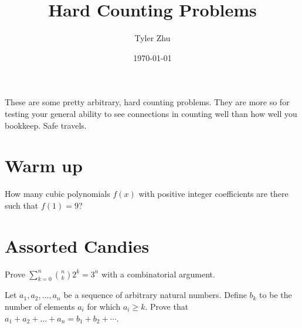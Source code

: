\documentclass[11 pt]{scrartcl}
\newcommand{\hwtitle}{Hard Counting Problems}
\newif\ifproblemsol
\begin{document}
 
\title{\Large \hwtitle{}}
\author{\large Tyler Zhu}
\date{\large\today}

\maketitle 

These are some pretty arbitrary, hard counting problems. They are more so for testing your general ability to see connections in counting well than how well you bookkeep. Safe travels.  

\section{Warm up}
\begin{problem}
    How many cubic polynomials $f(x)$ with positive integer coefficients are there such that $f(1) = 9$?
\end{problem}
\ifproblemsol
\begin{proof}[Solution]
    Let $f(x) = ax^3+bx^2+cx+d$. The only condition on $f(x)$ is that $f(1) = 9$, which means $a + b + c + d = 9$. Since $a,b,c,d$ are positive integers, there are $\binom{8}{3} = 56$ such polynomials. 
\end{proof}
\fi

\section{Assorted Candies}
\begin{problem}
    Prove $\sum_{k=0}^n \binom{n}{k} 2^k = 3^n$ with a combinatorial argument. 
\end{problem}
\ifproblemsol
\begin{proof}[Solution]
    Suppose we're trying to create a $n$-bead string with 3 colors; red, blue and green. We can either have 3 chocies for each spot for a total of $3^n$, or pick the $n-k$ spots which will be red, and then fill in the remaining $k$ spots with either blue or green for a total of $\binom{n}{k}2^k$ for each choice of $k$. 
\end{proof}
\fi

\begin{problem}
    Let $a_1, a_2, \dots, a_n$ be a sequence of arbitrary natural numbers. Define $b_k$ to be the number of elements $a_i$ for which $a_i \geq k$. Prove that $a_1 + a_2 + \dots + a_n = b_1 + b_2 + \cdots$. 
\end{problem}
\ifproblemsol
\begin{proof}[Solution]
    The idea is to double count. Drawing a picture is the best way to see this: for each $a_i$, draw $a_i$ circles vertically. Then the LHS is counting the number of circles going vertically, while the RHS is counting them horizontally. 
    
    Formally, one way to count is simply to sum the $a_i$'s. Another way to count uses the fact that they are natural numbers. All the $b_i$ start at 0. Then, for any given $a_i$, $b_1$ through $b_{a_i}$ will have all their values increased by $1$, increasing the total on the RHS by $a_i$. Hence the total contributions of all $a_i$ to the RHS is just $a_1 + \dots + a_n$. 
\end{proof}
\fi
\end{document}
